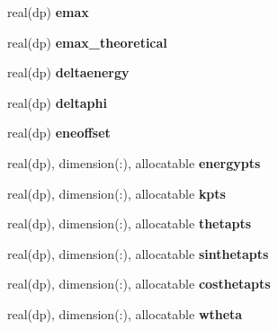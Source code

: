 \begin{DoxyCompactItemize}
real(dp) {\bfseries emax}
\item 
\mbox{\label{structcomm__surff_1_1kgrid_a3a01062a5619e1921f21ca0376eff1bf}} 
real(dp) {\bfseries emax\+\_\+theoretical}
\item 
\mbox{\label{structcomm__surff_1_1kgrid_a2f00699734a75f8878041536ec0cf1cc}} 
real(dp) {\bfseries deltaenergy}
\item 
\mbox{\label{structcomm__surff_1_1kgrid_a4457a0576d1d4f1f27d731af28d33089}} 
real(dp) {\bfseries deltaphi}
\item 
\mbox{\label{structcomm__surff_1_1kgrid_a615e1373a9257c4e299d5031cf2b10c0}} 
real(dp) {\bfseries eneoffset}
\item 
\mbox{\label{structcomm__surff_1_1kgrid_a1c0729a022d51cd209d811491dd987bf}} 
real(dp), dimension(\+:), allocatable {\bfseries energypts}
\item 
\mbox{\label{structcomm__surff_1_1kgrid_a9aa2922b0e890fbbdc0e248d2c804301}} 
real(dp), dimension(\+:), allocatable {\bfseries kpts}
\item 
\mbox{\label{structcomm__surff_1_1kgrid_af49f959483cfd2d33f694c23237b6a9a}} 
real(dp), dimension(\+:), allocatable {\bfseries thetapts}
\item 
\mbox{\label{structcomm__surff_1_1kgrid_a60c7310d3322e7835d3c2109d1b0857c}} 
real(dp), dimension(\+:), allocatable {\bfseries sinthetapts}
\item 
\mbox{\label{structcomm__surff_1_1kgrid_a8c58dd345a32aad7d7a42573291f3923}} 
real(dp), dimension(\+:), allocatable {\bfseries costhetapts}
\item 
\mbox{\label{structcomm__surff_1_1kgrid_a4347ed8bca6a80304ff6e9c7ed63be1c}} 
real(dp), dimension(\+:), allocatable {\bfseries wtheta}
\item 
\mbox{\label{structcomm__surff_1_1kgrid_ab138a6b58a798f9f21284095925d2285}} 

\end{DoxyCompactItemize}

